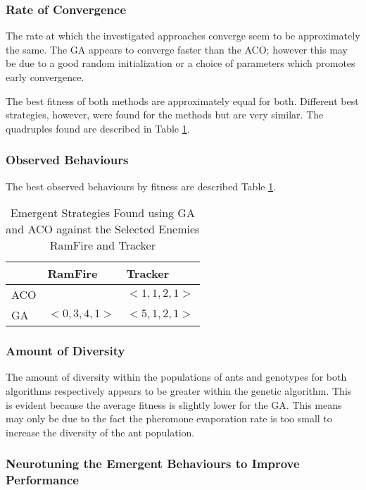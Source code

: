 
\subsubsection{Rate of Convergence}

The rate at which the investigated approaches converge seem to be approximately the same. The GA appears to converge faster than the ACO; however this may be due to a good random initialization or a choice of parameters which promotes early convergence.

The best fitness of both methods are approximately equal for both. Different best strategies, however, were found for the methods but are very similar. The quadruples found are described in Table \ref{foundstrats}.


\FigStrategyvRamFire
\FigStrategyvTracker

\subsubsection{Observed Behaviours}

The best observed behaviours by fitness are described Table \ref{foundstrats}.

\begin{table}
\centering
\begin{tabular}{|l|l|l|}
\hline
 & RamFire & Tracker \\
\hline
ACO & & $<1, 1, 2, 1>$ \\
\hline
GA & $<0, 3, 4, 1>$ & $<5, 1, 2, 1>$ \\
\hline
\end{tabular}
\caption{Emergent Strategies Found using GA and ACO against the Selected Enemies RamFire and Tracker}
\label{foundstrats}
\end{table}

\subsubsection{Amount of Diversity}

The amount of diversity within the populations of ants and genotypes for both algorithms respectively appears to be greater within the genetic algorithm. This is evident because the average fitness is slightly lower for the GA. This means may only be due to the fact the pheromone evaporation rate is too small to increase the diversity of the ant population.

\subsubsection{Neurotuning the Emergent Behaviours to Improve Performance}

